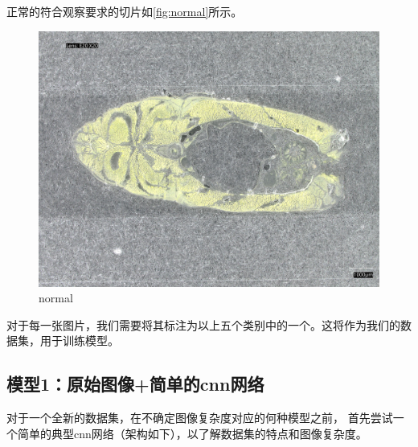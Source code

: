 正常的符合观察要求的切片如\autoref{fig:normal}所示。

\begin{figure}[H]
    \centering
    \begin{minipage}{0.45\textwidth}
        \centering
        \includegraphics[width=\textwidth]{./fig/sample_1/normal.jpg}
        \caption{normal}
        \label{fig:normal}
    \end{minipage}
\end{figure}


对于每一张图片，我们需要将其标注为以上五个类别中的一个。这将作为我们的数据集，用于训练模型。


\FloatBarrier

\subsection{模型1：原始图像+简单的cnn网络}

对于一个全新的数据集，在不确定图像复杂度对应的何种模型之前，
首先尝试一个简单的典型cnn网络（架构如下），以了解数据集的特点和图像复杂度。

